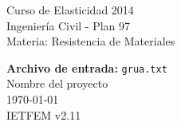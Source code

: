 \documentclass[a4paper,11pt]{article}
\begin{document}
      

\pagestyle{fancy}                            
\cfoot{}                                     


\begin{minipage}[t]{1\textwidth}      
\vspace{0.5mm}      
\noindent      
Curso de Elasticidad 2014 \\     
Ingeniería Civil - Plan 97 \\      
Materia: Resistencia de Materiales      

\begin{center}      
\textbf{\Large{ Archivo de entrada:}}\Large{ \verb+grua.txt+}  \\      
\large{Nombre del proyecto\\}       
\today\\      
IETFEM v2.11      
\vspace{-2.9cm}      
\end{center}      
\end{minipage}      
\hspace{-2cm}      
\end{document}
